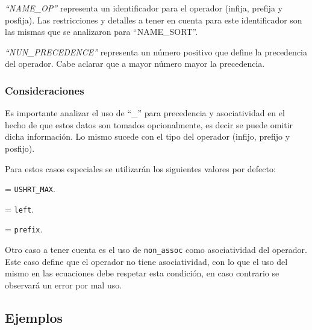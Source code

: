 \textit{``NAME\_OP''} representa un identificador para el operador (infija, prefija y posfija). Las restricciones y detalles a tener en cuenta para este identificador son las mismas que se analizaron para ``NAME\_SORT''.

\textit{``NUN\_PRECEDENCE''} representa un número positivo que define la precedencia del operador. Cabe aclarar que a mayor número mayor la precedencia.

\subsubsection*{Consideraciones}

Es importante analizar el uso de ``\_'' para precedencia y asociatividad en el hecho de que estos datos son tomados opcionalmente, es decir se puede omitir dicha información. Lo mismo sucede con el tipo del operador (infijo, prefijo y posfijo). 

Para estos casos especiales se utilizarán los siguientes valores por defecto:

\begin{description}
\label{desc:default}
\item [Precedencia] = \texttt{USHRT\_MAX}.

\item [Asociatividad] = \texttt{left}.

\item [Tipo de operador] = \texttt{prefix}.
\end{description}

Otro caso a tener cuenta es el uso de \texttt{non\_assoc} como asociatividad del operador. Este caso define que el operador no tiene asociatividad, con lo que el uso del mismo en las ecuaciones debe respetar esta condición, en caso contrario se observará un error por mal uso.
\subsection*{Ejemplos}

